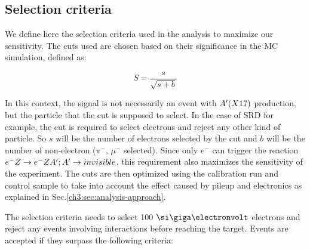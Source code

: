 \subsection{Selection criteria}
\label{ch3:sec:selection-criteria}

We define here the selection criteria used in the analysis to maximize our sensitivity. The cuts used are chosen based on their significance in the MC simulation, defined as:

\begin{equation}
  \label{eq:significance}
  S = \frac{s}{\sqrt{s + b}}
\end{equation}

In this context, the signal is not necessarily an event with $A'(X17)$ production, but the particle that the cut is supposed to select. In the case of SRD for example, the cut is required to select electrons and reject any other kind of particle. So $s$ will be the number of electrons selected by the cut and $b$ will be the number of non-electron ($\pi^-$, $\mu^-$ selected). Since only $e^{-}$ can trigger the reaction $e^- Z \to e^- Z A'; A' \to invisible$, this requirement also maximizes the sensitivity of the experiment. The cuts are then optimized using the calibration run and control sample to take into account the effect caused by pileup and electronics as explained in Sec.\ref{ch3:sec:analysis-approach}.


The selection criteria needs to select 100 $\gev$ electrons and reject any events involving interactions before reaching the target. Events are accepted if they surpass the following criteria:


